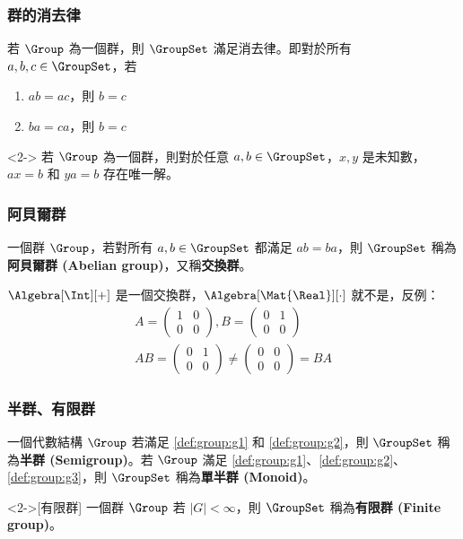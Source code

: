 \documentclass[utf8]{beamer}
\begin{document}
\begin{CJK}{UTF8}{bkai}
\begin{frame}
  \frametitle{群的消去律}
  \begin{mypropo}
  \label{pro:group:cancellation_law}
  若 $\Group$ 為一個群，則 $\GroupSet$ 滿足消去律。即對於所有 $a,b,c\in{\GroupSet}$，若
  \begin{enumerate}
  \item $ab=ac$，則 $b=c$
  \item $ba=ca$，則 $b=c$
  \end{enumerate}
  \end{mypropo}
  \begin{mythm}<2->
  \label{thm:group:equilibrium}
  若 $\Group$ 為一個群，則對於任意 $a,b\in{\GroupSet}$，$x,y$ 是未知數，$ax=b$ 和 $ya=b$ 存在唯一解。
  \end{mythm}
\end{frame}

\begin{frame}
  \frametitle{阿貝爾群}
  \begin{mydef}[阿貝爾群]
  \label{def:group:abelian_group}
  一個群 $\Group$，若對所有 $a,b\in{\GroupSet}$ 都滿足 $ab=ba$，則 $\GroupSet$ 稱為\textbf{阿貝爾群 (Abelian group)}，又稱\textbf{交換群}。
  \end{mydef}
  \begin{myexample}
  $\Algebra[\Int][+]$ 是一個交換群，$\Algebra[\Mat{\Real}][\cdot]$ 就不是，反例：\pause
  \begin{align*}
  A=\left(\begin{array}{cc}
  1 & 0\\
  0 & 0
  \end{array}\right),
  B=\left(\begin{array}{cc}
  0 & 1\\
  0 & 0
  \end{array}\right)\\
  AB=\left(\begin{array}{cc}
  0 & 1\\
  0 & 0
  \end{array}\right)\neq\left(\begin{array}{cc}
  0 & 0\\
  0 & 0
  \end{array}\right)=BA
  \end{align*}
  \end{myexample}
\end{frame}

\begin{frame}
  \frametitle{半群、有限群}
  \begin{mydef}[半群和單半群]
  \label{def:group:semigroup_and_monoid}
  一個代數結構 $\Group$ 若滿足 \ref{def:group:g1} 和 \ref{def:group:g2}，則 $\GroupSet$ 稱為\textbf{半群 (Semigroup)}。若 $\Group$ 滿足 \ref{def:group:g1}、\ref{def:group:g2}、\ref{def:group:g3}，則 $\GroupSet$ 稱為\textbf{單半群 (Monoid)}。
  \end{mydef}
  \begin{mydef}<2->[有限群]
  \label{def:group:finite_group}
  一個群 $\Group$ 若 $|G|<\infty$，則 $\GroupSet$ 稱為\textbf{有限群 (Finite group)}。
  \end{mydef}
\end{frame}


\end{CJK}
\end{document}
